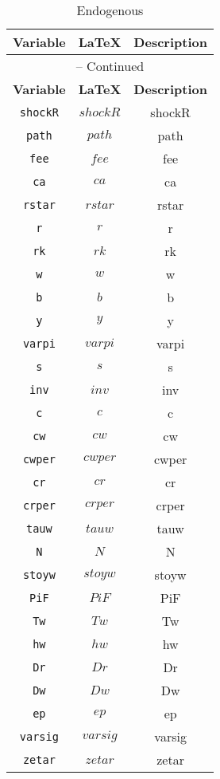 \begin{center}
\begin{longtable}{ccc}
\caption{Endogenous}\\%
\hline%
\multicolumn{1}{c}{\textbf{Variable}} &
\multicolumn{1}{c}{\textbf{\LaTeX}} &
\multicolumn{1}{c}{\textbf{Description}}\\%
\hline\hline%
\endfirsthead
\multicolumn{3}{c}{{\tablename} \thetable{} -- Continued}\\%
\hline%
\multicolumn{1}{c}{\textbf{Variable}} &
\multicolumn{1}{c}{\textbf{\LaTeX}} &
\multicolumn{1}{c}{\textbf{Description}}\\%
\hline\hline%
\endhead
\texttt{shockR} & $shockR$ & shockR\\
\texttt{path} & $path$ & path\\
\texttt{fee} & $fee$ & fee\\
\texttt{ca} & $ca$ & ca\\
\texttt{rstar} & $rstar$ & rstar\\
\texttt{r} & $r$ & r\\
\texttt{rk} & $rk$ & rk\\
\texttt{w} & $w$ & w\\
\texttt{b} & $b$ & b\\
\texttt{y} & $y$ & y\\
\texttt{varpi} & $varpi$ & varpi\\
\texttt{s} & $s$ & s\\
\texttt{inv} & $inv$ & inv\\
\texttt{c} & $c$ & c\\
\texttt{cw} & $cw$ & cw\\
\texttt{cwper} & $cwper$ & cwper\\
\texttt{cr} & $cr$ & cr\\
\texttt{crper} & $crper$ & crper\\
\texttt{tauw} & $tauw$ & tauw\\
\texttt{N} & $N$ & N\\
\texttt{stoyw} & $stoyw$ & stoyw\\
\texttt{PiF} & $PiF$ & PiF\\
\texttt{Tw} & $Tw$ & Tw\\
\texttt{hw} & $hw$ & hw\\
\texttt{Dr} & $Dr$ & Dr\\
\texttt{Dw} & $Dw$ & Dw\\
\texttt{ep} & $ep$ & ep\\
\texttt{varsig} & $varsig$ & varsig\\
\texttt{zetar} & $zetar$ & zetar\\

\end{longtable}
\end{center}
